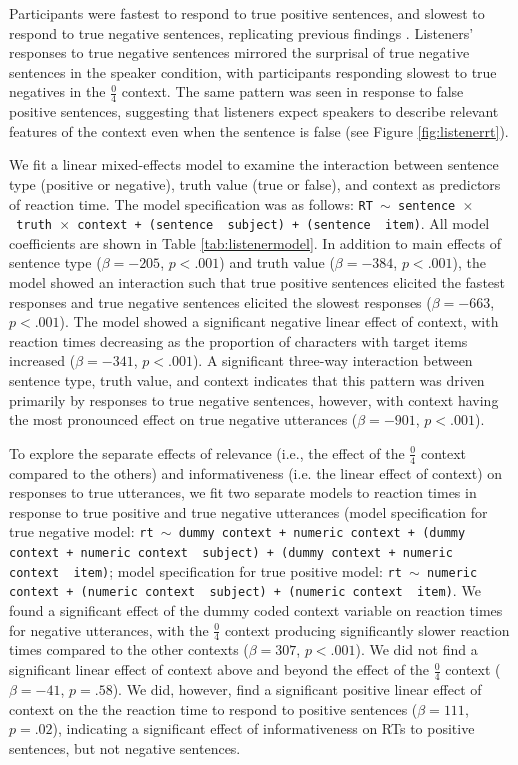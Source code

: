 \documentclass[man, noapacite]{apa2}
\begin{document}
Participants were fastest to respond to true positive sentences, and slowest to respond to true negative sentences, replicating previous findings \cite{hclark1972}.  Listeners' responses to true negative sentences mirrored the surprisal of true negative sentences in the speaker condition, with participants responding slowest to true negatives in the $\frac{0}{4}$ context.  The same pattern was seen in response to false positive sentences, suggesting that listeners expect speakers to describe relevant features of the context even when the sentence is false (see Figure \ref{fig:listenerrt}).  

We fit a linear mixed-effects model to examine the interaction between sentence type (positive or negative), truth value (true or false), and context as predictors of reaction time. The model specification was as follows: \texttt{RT $\sim$ sentence~$\times$~truth~$\times$~context + (sentence~\textbar~subject) +  (sentence~\textbar~item)}. All model coefficients are shown in Table \ref{tab:listenermodel}. In addition to main effects of sentence type ($\beta= -205$, $p< .001$) and truth value ($\beta= -384$, $p< .001$), the model showed an interaction such that true positive sentences elicited the fastest responses and true negative sentences elicited the slowest responses ($\beta= -663$, $p< .001$). The model showed a significant negative linear effect of context, with reaction times decreasing as the proportion of characters with target items increased ($\beta= -341$, $p< .001$). A significant three-way interaction between sentence type, truth value, and context indicates that this pattern was driven primarily by responses to true negative sentences, however, with context having the most pronounced effect on true negative utterances ($\beta= -901$, $p< .001$).  

To explore the separate effects of relevance (i.e., the effect of the $\frac{0}{4}$ context compared to the others) and informativeness (i.e. the linear effect of context) on responses to true utterances, we fit two separate models to reaction times in response to true positive and true negative utterances (model specification for true negative model: \texttt{rt $\sim$  dummy context + numeric context + (dummy context + numeric context~\textbar~subject) +  (dummy context + numeric context~\textbar~item)}; model specification for true positive model: \texttt{rt $\sim$  numeric context + (numeric context~\textbar~subject) +  (numeric context~\textbar~item)}. We found a significant effect of the dummy coded context variable on reaction times for negative utterances, with the $\frac{0}{4}$ context producing significantly slower reaction times compared to the other contexts ($\beta= 307$, $p< .001$). We did not find a significant linear effect of context above and beyond the effect of the  $\frac{0}{4}$ context ($\beta= -41$, $p = .58$). We did, however, find a significant positive linear effect of context on the the reaction time to respond to positive sentences ($\beta= 111$, $p = .02$), indicating a significant effect of informativeness on RTs to positive sentences, but not negative sentences. 
\end{document}
